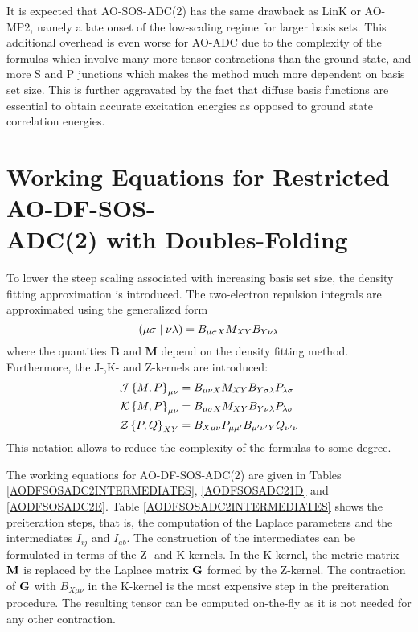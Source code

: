 It is expected that AO-SOS-ADC(2) has the same drawback as LinK or AO-MP2, namely a late onset of the low-scaling regime for larger basis sets. This additional overhead is even worse for AO-ADC due to the complexity of the formulas which involve many more tensor contractions than the ground state, and more S and P junctions which makes the method much more dependent on basis set size. This is further aggravated by the fact that diffuse basis functions are essential to obtain accurate excitation energies as opposed to ground state correlation energies.

\section{Working Equations for Restricted AO-DF-SOS-\\ ADC(2) with Doubles-Folding}

To lower the steep scaling associated with increasing basis set size, the density fitting approximation is introduced. The two-electron repulsion integrals are approximated using the generalized form
\begin{equation}
\left( \mu\sigma \mid \nu\lambda \right) = B_{\mu\sigma X} M_{XY} B_{Y \nu\lambda}
\end{equation}
\noindent where the quantities $\mathbf{B}$ and $\mathbf{M}$ depend on the density fitting method. Furthermore, the J-,K- and Z-kernels are introduced:
\begin{align}
\mathcal{J}\left\lbrace M,P \right\rbrace_{\mu\nu} &= B_{\mu\nu X} M_{XY} B_{Y\sigma\lambda} P_{\lambda\sigma} \\
\mathcal{K}\left\lbrace M,P \right\rbrace_{\mu\nu} &= B_{\mu\sigma X} M_{XY} B_{Y \nu\lambda} P_{\lambda\sigma} \\
\mathcal{Z}\left\lbrace P,Q \right\rbrace_{XY} &= B_{X\mu\nu} P_{\mu\mu'} B_{\mu'\nu' Y} Q_{\nu' \nu} 
\end{align}
\noindent This notation allows to reduce the complexity of the formulas to some degree. 

The working equations for AO-DF-SOS-ADC(2) are given in Tables \ref{AODFSOSADC2INTERMEDIATES}, \ref{AODFSOSADC21D} and \ref{AODFSOSADC2E}. Table \ref{AODFSOSADC2INTERMEDIATES} shows the preiteration steps, that is, the computation of the Laplace parameters and the intermediates $I_{ij}$ and $I_{ab}$. The construction of the intermediates can be formulated in terms of the Z- and K-kernels. In the K-kernel, the metric matrix $\mathbf{M}$ is replaced by the Laplace matrix $\mathbf{G}$ formed by the Z-kernel. The contraction of $\mathbf{G}$ with $B_{X\mu\nu}$ in the K-kernel is the most expensive step in the preiteration procedure. The resulting tensor can be computed on-the-fly as it is not needed for any other contraction.

